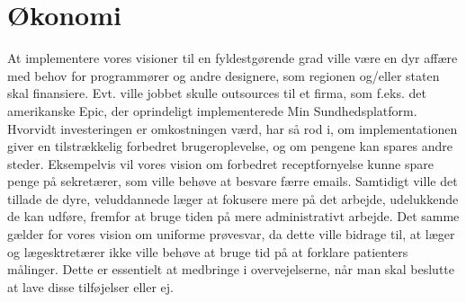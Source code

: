 \section{Økonomi}
At implementere vores visioner til en fyldestgørende grad ville være en dyr affære med behov for programmører og andre designere, som regionen og/eller staten skal finansiere. Evt. ville jobbet skulle outsources til et firma, som f.eks. det amerikanske Epic, der oprindeligt implementerede Min Sundhedsplatform. Hvorvidt investeringen er omkostningen værd, har så rod i, om implementationen giver en tilstrækkelig forbedret brugeroplevelse, og om pengene kan spares andre steder. Eksempelvis vil vores vision om forbedret receptfornyelse kunne spare penge på sekretærer, som ville behøve at besvare færre emails. Samtidigt ville det tillade de dyre, veluddannede læger at fokusere mere på det arbejde, udelukkende de kan udføre, fremfor at bruge tiden på mere administrativt arbejde. Det samme gælder for vores vision om uniforme prøvesvar, da dette ville bidrage til, at læger og lægesktretærer ikke ville behøve at bruge tid på at forklare patienters målinger. Dette er essentielt at medbringe i overvejelserne, når man skal beslutte at lave disse tilføjelser eller ej. 
